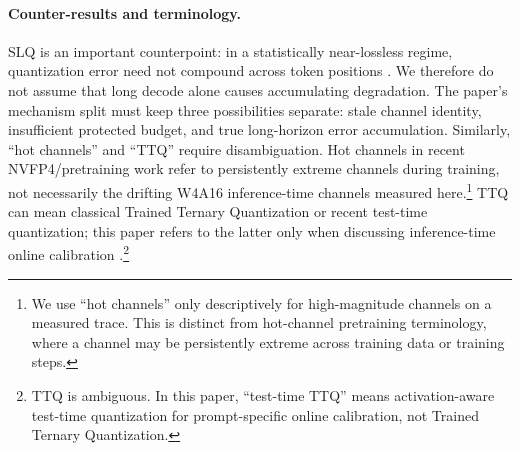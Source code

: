 \paragraph{Counter-results and terminology.}
SLQ is an important counterpoint: in a statistically near-lossless regime,
quantization error need not compound across token positions
\citep{helcig2026slq}.  We therefore do not assume that long decode alone
causes accumulating degradation.  The paper's mechanism split must keep three
possibilities separate: stale channel identity, insufficient protected budget,
and true long-horizon error accumulation.  Similarly, ``hot channels'' and
``TTQ'' require disambiguation.  Hot channels in recent NVFP4/pretraining
work refer to persistently extreme channels during training, not necessarily
the drifting W4A16 inference-time channels measured here.\footnote{We use
``hot channels'' only descriptively for high-magnitude channels on a measured
trace.  This is distinct from hot-channel pretraining terminology, where a
channel may be persistently extreme across training data or training steps.}
TTQ can mean classical Trained Ternary Quantization or recent test-time
quantization; this paper refers to the latter only when discussing
inference-time online calibration \citep{koikeakino2026ttq}.\footnote{TTQ is
ambiguous.  In this paper, ``test-time TTQ'' means activation-aware
test-time quantization for prompt-specific online calibration, not Trained
Ternary Quantization.}
